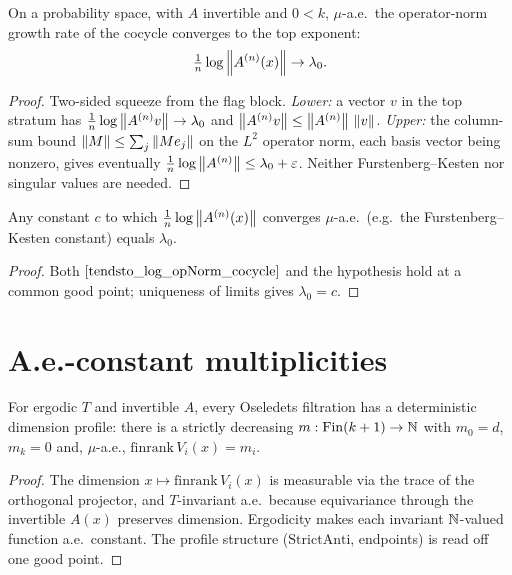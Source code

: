 \begin{theorem}[Top exponent = norm growth]\label{tendsto_log_opNorm_cocycle}
  \leanok
  On a probability space, with $A$ invertible and $0 < k$, $\mu$-a.e.\ the operator-norm growth rate of the cocycle converges to the top exponent:
  \[ \tfrac1n \log\left\lVert A^{(n)}(x) \right\rVert \to \lambda_0. \]
\end{theorem}
\begin{proof}\leanok
  Two-sided squeeze from the flag block. \emph{Lower:} a vector $v$ in the top stratum has $\tfrac1n\log\left\lVert A^{(n)}v \right\rVert \to \lambda_0$ and $\left\lVert A^{(n)}v \right\rVert \le \left\lVert A^{(n)} \right\rVert\,\left\lVert v \right\rVert$. \emph{Upper:} the column-sum bound $\left\lVert M \right\rVert \le \sum_j \left\lVert M e_j \right\rVert$ on the $L^2$ operator norm, each basis vector being nonzero, gives eventually $\tfrac1n\log\left\lVert A^{(n)} \right\rVert \le \lambda_0 + \varepsilon$. Neither Furstenberg--Kesten nor singular values are needed.
\end{proof}

\begin{corollary}\label{oseledets_top_exponent_eq_furstenbergKesten}
  \leanok
  Any constant $c$ to which $\tfrac1n\log\left\lVert A^{(n)}(x) \right\rVert$ converges $\mu$-a.e.\ (e.g.\ the Furstenberg--Kesten constant) equals $\lambda_0$.
\end{corollary}
\begin{proof}\leanok
  Both $\ref{tendsto_log_opNorm_cocycle}$ and the hypothesis hold at a common good point; uniqueness of limits gives $\lambda_0 = c$.
\end{proof}

\section{A.e.-constant multiplicities}

\begin{theorem}\label{exists_finrank_ae_eq}
  \leanok
  For ergodic $T$ and invertible $A$, every Oseledets filtration has a deterministic dimension profile: there is a strictly decreasing $m : \mathrm{Fin}(k+1) \to \mathbb{N}$ with $m_0 = d$, $m_k = 0$ and, $\mu$-a.e., $\mathrm{finrank}\,V_i(x) = m_i$.
\end{theorem}
\begin{proof}\leanok
  The dimension $x \mapsto \mathrm{finrank}\,V_i(x)$ is measurable via the trace of the orthogonal projector, and $T$-invariant a.e.\ because equivariance through the invertible $A(x)$ preserves dimension. Ergodicity makes each invariant $\mathbb{N}$-valued function a.e.\ constant. The profile structure ($\mathrm{StrictAnti}$, endpoints) is read off one good point.
\end{proof}

